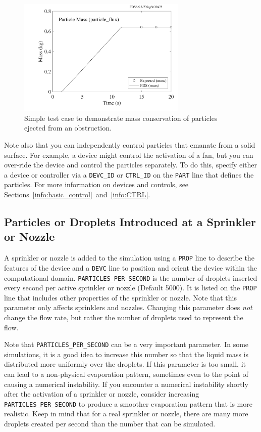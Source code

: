 \documentclass[11pt]{book}
\newcommand{\ct}{\tt\small}
\begin{document}
\begin{figure}[ht]
\begin{center}
\includegraphics[height=2.2in]{SCRIPT_FIGURES/particle_flux}
\end{center}
\caption[Results of the {\ct particle\_flux} test case]{Simple test case to demonstrate mass conservation of particles ejected from an obstruction.}
\label{particle_flux}
\end{figure}

Note also that you can independently control particles that emanate from a solid surface. For example, a device might control the
activation of a fan, but you can over-ride the device and control the particles separately. To do this, specify either
a device or controller via a {\ct DEVC\_ID} or {\ct CTRL\_ID} on the {\ct PART} line that defines the particles. For more
information on devices and controls, see Sections~\ref{info:basic_control}~and~\ref{info:CTRL}.



\subsection{Particles or Droplets Introduced at a Sprinkler or Nozzle}
\label{info:sprinkler_droplets}

A sprinkler or nozzle is added to the simulation using a {\ct PROP} line to describe the features of the device and a {\ct DEVC} line to position and orient the
device within the computational domain.
{\ct PARTICLES\_PER\_SECOND} is the  number of droplets inserted every
second per active sprinkler or nozzle (Default 5000). It is listed on the {\ct PROP} line that includes other properties of
the sprinkler or nozzle. Note that this parameter only affects sprinklers and nozzles.
Changing this parameter does {\em not} change the flow rate, but rather the number
of droplets used to represent the flow.

Note that {\ct PARTICLES\_PER\_SECOND} can be a very important parameter. In some simulations, it is a good idea to increase this number so that the
liquid mass is distributed more uniformly over the droplets. If this parameter is too small, it can lead to a non-physical evaporation pattern, sometimes even to the
point of causing a numerical instability. If you encounter a numerical instability shortly after the activation of a sprinkler or nozzle, consider increasing
{\ct PARTICLES\_PER\_SECOND} to produce a smoother evaporation pattern that is more realistic. Keep in mind that for a real sprinkler or nozzle, there are many more
droplets created per second than the number that can be simulated.
\end{document}
